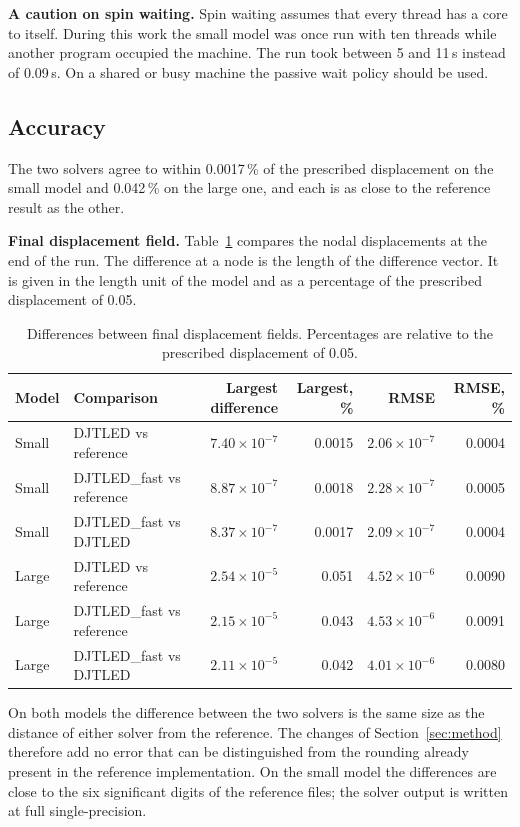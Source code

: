 \documentclass[11pt,a4paper]{article}
\newcommand{\DJF}{DJTLED\_fast}
\begin{document}
\textbf{A caution on spin waiting.} Spin waiting assumes that every thread has a core to itself. During this work the small model was once run with ten threads while another program occupied the machine. The run took between 5 and 11\,s instead of 0.09\,s. On a shared or busy machine the passive wait policy should be used.

\subsection{Accuracy}
\label{sec:accuracy}

The two solvers agree to within 0.0017\,\% of the prescribed displacement on the small model and 0.042\,\% on the large one, and each is as close to the reference result as the other.

\textbf{Final displacement field.} Table~\ref{tab:accuracy} compares the nodal displacements at the end of the run. The difference at a node is the length of the difference vector. It is given in the length unit of the model and as a percentage of the prescribed displacement of 0.05.

\begin{table}[ht]
\centering
\small
\caption{Differences between final displacement fields. Percentages are relative to the prescribed displacement of 0.05.}
\label{tab:accuracy}
\begin{tabular}{@{}llrrrr@{}}
\toprule
Model & Comparison & Largest difference & Largest, \% & RMSE & RMSE, \% \\
\midrule
Small & DJTLED vs reference & $7.40\times10^{-7}$ & 0.0015 & $2.06\times10^{-7}$ & 0.0004 \\
Small & \DJF{} vs reference & $8.87\times10^{-7}$ & 0.0018 & $2.28\times10^{-7}$ & 0.0005 \\
Small & \DJF{} vs DJTLED & $8.37\times10^{-7}$ & 0.0017 & $2.09\times10^{-7}$ & 0.0004 \\
\addlinespace
Large & DJTLED vs reference & $2.54\times10^{-5}$ & 0.051 & $4.52\times10^{-6}$ & 0.0090 \\
Large & \DJF{} vs reference & $2.15\times10^{-5}$ & 0.043 & $4.53\times10^{-6}$ & 0.0091 \\
Large & \DJF{} vs DJTLED & $2.11\times10^{-5}$ & 0.042 & $4.01\times10^{-6}$ & 0.0080 \\
\bottomrule
\end{tabular}
\end{table}

On both models the difference between the two solvers is the same size as the distance of either solver from the reference. The changes of Section~\ref{sec:method} therefore add no error that can be distinguished from the rounding already present in the reference implementation. On the small model the differences are close to the six significant digits of the reference files; the solver output is written at full single-precision.
\end{document}
